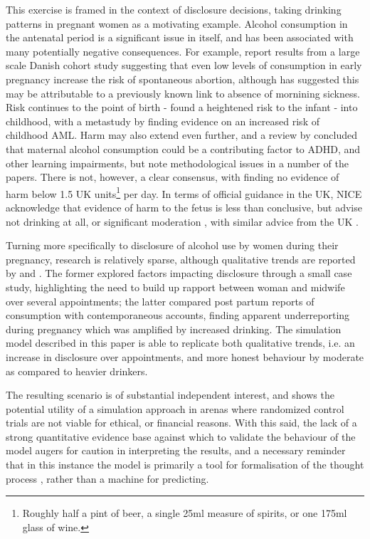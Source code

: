 This exercise is framed in the context of disclosure decisions, taking drinking patterns in pregnant women as a motivating example. Alcohol consumption in the antenatal period is a significant issue in itself, and has been associated with many potentially negative consequences. For example, \citet{Andersen2012} report results from a large scale Danish cohort study suggesting that even low levels of consumption in early pregnancy increase the risk of spontaneous abortion, although \citet{Savitz2012} has suggested this may be attributable to a previously known link to absence of mornining sickness. Risk continues to the point of birth - \citet{Kesmodel2002} found a heightened risk to the infant - into childhood, with a metastudy by \citet{Latino-Martel2010} finding evidence on an increased risk of childhood \ac{AML}. Harm may also extend even further, and a review by \citet{Huizink2006} concluded that maternal alcohol consumption could be a contributing factor to \ac{ADHD}, and other learning impairments, but note methodological issues in a number of the papers. There is not, however, a clear consensus, with \citet{Gray2006} finding no evidence of harm below 1.5 UK units\footnote{Roughly half a pint of beer, a single 25ml measure of spirits, or one 175ml glass of wine.} per day. In terms of official guidance in the UK, \ac{NICE} acknowledge that evidence of harm to the fetus is less than conclusive, but advise not drinking at all, or significant moderation \citep{NICE2010a}, with similar advice from the UK \cite{DepartmentofHealth2008}.

Turning more specifically to disclosure of alcohol use by women during their pregnancy, research is relatively sparse, although qualitative trends are reported by \citet{Phillips2007} and \citet{Alvik2006}. The former explored factors impacting disclosure through a small case study, highlighting the need to build up rapport between woman and midwife over several appointments; the latter compared post partum reports of consumption with contemporaneous accounts, finding apparent underreporting during pregnancy which was amplified by increased drinking. The simulation model described in this paper is able to replicate both qualitative trends, i.e. an increase in disclosure over appointments, and more honest behaviour by moderate as compared to heavier drinkers.

The resulting scenario is of substantial independent interest, and shows the potential utility of a simulation approach in arenas where randomized control trials are not viable for ethical, or financial reasons. With this said, the lack of a strong quantitative evidence base against which to validate the behaviour of the model augers for caution in interpreting the results, and a necessary reminder that in this instance the model is primarily a tool for formalisation of the thought process \citep{epstein2008}, rather than a machine for predicting.

